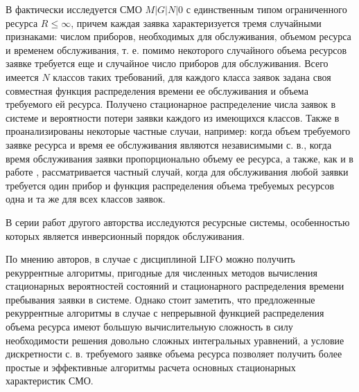 \documentclass[a4paper,12pt]{article}
\begin{document}
В \cite{Tihonenko_26_2005} фактически исследуется СМО $M|G|N|0$ с единственным типом ограниченного ресурса $R\leq \infty$, причем каждая заявка характеризуется тремя случайными признаками: числом приборов, необходимых для обслуживания, объемом ресурса и временем обслуживания, т. е. помимо некоторого случайного объема ресурсов заявке требуется еще и случайное число приборов для обслуживания. Всего имеется $N$ классов таких требований, для каждого класса заявок задана своя совместная функция распределения времени ее обслуживания и объема требуемого ей ресурса. Получено стационарное распределение числа заявок в системе и вероятности потери заявки каждого из имеющихся классов. Также в \cite{Tihonenko_26_2005} проанализированы некоторые частные случаи, например: когда объем требуемого заявке ресурса и время ее обслуживания являются независимыми с. в., когда время обслуживания заявки пропорционально объему ее ресурса, а также, как и в работе \cite{Romm_21_1971}, рассматривается частный случай, когда для обслуживания любой заявки требуется один прибор и функция распределения объема требуемых ресурсов одна и та же для всех классов заявок.



В серии работ другого авторства \cite{Pechinkin_28_2011,Pechinkin_29_2012,Pechinkin_30_1998,Pechinkin_31_1999} исследуются ресурсные системы, особенностью которых является инверсионный порядок обслуживания.

По мнению авторов, в случае с дисциплиной LIFO можно получить рекуррентные алгоритмы, пригодные для численных методов вычисления стационарных вероятностей состояний и стационарного распределения времени пребывания заявки в системе. Однако стоит заметить, что предложенные рекуррентные алгоритмы в случае с непрерывной функцией распределения объема ресурса \cite{Pechinkin_30_1998,Pechinkin_31_1999} имеют большую вычислительную сложность в силу необходимости решения довольно сложных интегральных уравнений, а условие дискретности с. в. требуемого заявке объема ресурса \cite{Pechinkin_28_2011,Pechinkin_29_2012} позволяет получить более простые и эффективные алгоритмы расчета основных стационарных характеристик СМО.
\end{document}
